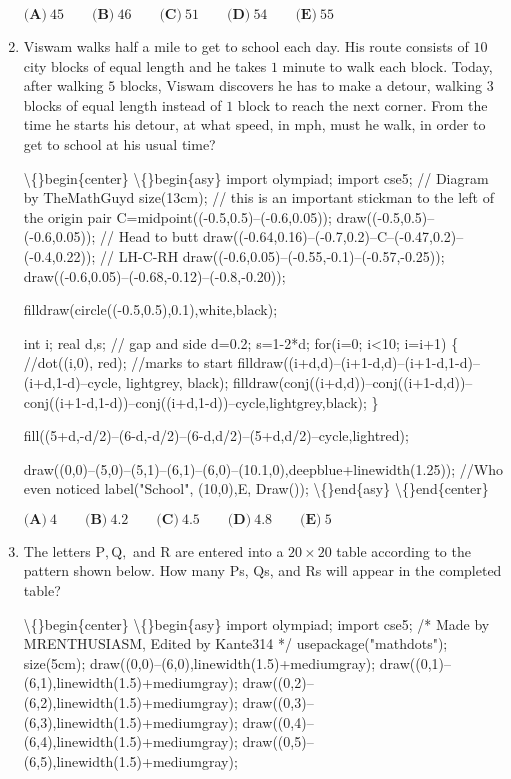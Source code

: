 \documentclass{article}
\begin{document}
\begin{enumerate}[label=\arabic*., itemsep=0.5em]
\(\textbf{(A)}\ 45 \qquad \textbf{(B)}\ 46 \qquad \textbf{(C)}\ 51 \qquad \textbf{(D)}\ 54\qquad \textbf{(E)}\ 55\)\par \vspace{0.5em}\item Viswam walks half a mile to get to school each day. His route consists of \(10\) city blocks of equal length and he takes \(1\) minute to walk each block. Today, after walking \(5\) blocks, Viswam discovers he has to make a detour, walking \(3\) blocks of equal length instead of \(1\) block to reach the next corner. From the time he starts his detour, at what speed, in mph, must he walk, in order to get to school at his usual time?

\textbackslash\{\}begin\{center\}
\textbackslash\{\}begin\{asy\}
import olympiad;
import cse5;
// Diagram by TheMathGuyd
size(13cm);
// this is an important stickman to the left of the origin
pair C=midpoint((-0.5,0.5)--(-0.6,0.05));
draw((-0.5,0.5)--(-0.6,0.05)); // Head to butt
draw((-0.64,0.16)--(-0.7,0.2)--C--(-0.47,0.2)--(-0.4,0.22)); // LH-C-RH
draw((-0.6,0.05)--(-0.55,-0.1)--(-0.57,-0.25));
draw((-0.6,0.05)--(-0.68,-0.12)--(-0.8,-0.20));

filldraw(circle((-0.5,0.5),0.1),white,black);

int i;
real d,s; // gap and side
d=0.2; s=1-2*d;
for(i=0; i<10; i=i+1)
\{
  //dot((i,0), red); //marks to start
  filldraw((i+d,d)--(i+1-d,d)--(i+1-d,1-d)--(i+d,1-d)--cycle, lightgrey, black);
  filldraw(conj((i+d,d))--conj((i+1-d,d))--conj((i+1-d,1-d))--conj((i+d,1-d))--cycle,lightgrey,black);
\}

fill((5+d,-d/2)--(6-d,-d/2)--(6-d,d/2)--(5+d,d/2)--cycle,lightred);

draw((0,0)--(5,0)--(5,1)--(6,1)--(6,0)--(10.1,0),deepblue+linewidth(1.25)); //Who even noticed
label("School", (10,0),E, Draw());
\textbackslash\{\}end\{asy\}
\textbackslash\{\}end\{center\}

\(\textbf{(A)}\ 4 \qquad \textbf{(B)}\ 4.2 \qquad \textbf{(C)}\ 4.5 \qquad \textbf{(D)}\ 4.8 \qquad \textbf{(E)}\ 5\)\par \vspace{0.5em}\item The letters \(\text{P}, \text{Q},\) and \(\text{R}\) are entered into a \(20\times20\) table according to the pattern shown below. How many \(\text{P}\)s, \(\text{Q}\)s, and \(\text{R}\)s will appear in the completed table? 

\textbackslash\{\}begin\{center\}
\textbackslash\{\}begin\{asy\}
import olympiad;
import cse5;
/* Made by MRENTHUSIASM, Edited by Kante314 */
usepackage("mathdots");
size(5cm);
draw((0,0)--(6,0),linewidth(1.5)+mediumgray);
draw((0,1)--(6,1),linewidth(1.5)+mediumgray);
draw((0,2)--(6,2),linewidth(1.5)+mediumgray);
draw((0,3)--(6,3),linewidth(1.5)+mediumgray);
draw((0,4)--(6,4),linewidth(1.5)+mediumgray);
draw((0,5)--(6,5),linewidth(1.5)+mediumgray);


\end{enumerate}
\end{document}
